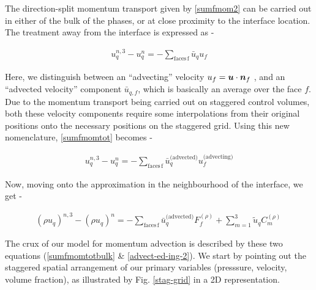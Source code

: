 The direction-split momentum transport given by \eqref{sumfmom2}
can be carried out in either of the bulk of the phases, or at
close proximity to the interface location. The treatment away 
from the interface is expressed as - 



\begin{align}
{u^{n,3}_q - u_q^{n}} =  - \sum_{\textrm{faces} \, \textrm{f}}  \bar u_{q} u_f 
\label{sumfmomtot}
\end{align}


Here, we distinguish between an ``advecting'' velocity 
$u_{f}= \boldsymbol{u} \cdot \boldsymbol{n}_f $
,
and an ``advected velocity'' component $\bar u_{q,f}$, 
which is basically an average over the face $f$. 
Due to the momentum transport being carried out on 
staggered control volumes, both these velocity components
require some interpolations from their original positions
onto the necessary positions on the staggered grid.
Using this new nomenclature, \eqref{sumfmomtot} becomes -

\begin{align}
{u^{n,3}_q - u_q^{n}} =  - \sum_{\textrm{faces} \, \textrm{f}}  \bar u_{q}^{\textrm{(advected)}} 
u^{\textrm{(advecting)}}_f   
\label{sumfmomtotbulk}
\end{align}
	
Now, moving onto the approximation in the neighbourhood
of the interface, we get - 



\begin{align}
	{(\rho u_q)^{n,3} - (\rho u_q)^{n}} =  - \sum_{\textrm{faces} \, \textrm{f}}  \bar u_{q}^{\textrm{(advected)}}  
F^{(\rho)}_{f} + \sum_{m=1}^3 \tilde u_q C_m^{(\rho)} \, 
\label{advect-ed-ing-2}
\end{align}


The crux of our model for momentum advection is described 
by these two equations (\eqref{sumfmomtotbulk} \& \eqref{advect-ed-ing-2}).
We start by pointing out the staggered spatial arrangement of our
primary variables (presssure, velocity, volume fraction), 
as illustrated by Fig. \ref{stag-grid} in a 2D representation.  


